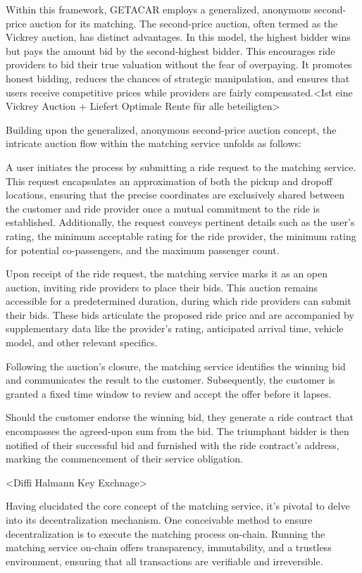 Within this framework, GETACAR employs a generalized, anonymous second-price auction for its matching. The second-price auction, often termed as the Vickrey auction, has distinct advantages. In this model, the highest bidder wins but pays the amount bid by the second-highest bidder. This encourages ride providers to bid their true valuation without the fear of overpaying. It promotes honest bidding, reduces the chances of strategic manipulation, and ensures that users receive competitive prices while providers are fairly compensated.<Ist eine Vickrey Auction + Liefert Optimale Rente für alle beteiligten>


Building upon the generalized, anonymous second-price auction concept, the intricate auction flow within the matching service unfolds as follows:

A user initiates the process by submitting a ride request to the matching service. This request encapsulates an approximation of both the pickup and dropoff locations, ensuring that the precise coordinates are exclusively shared between the customer and ride provider once a mutual commitment to the ride is established. Additionally, the request conveys pertinent details such as the user's rating, the minimum acceptable rating for the ride provider, the minimum rating for potential co-passengers, and the maximum passenger count.

Upon receipt of the ride request, the matching service marks it as an open auction, inviting ride providers to place their bids. This auction remains accessible for a predetermined duration, during which ride providers can submit their bids. These bids articulate the proposed ride price and are accompanied by supplementary data like the provider's rating, anticipated arrival time, vehicle model, and other relevant specifics.

Following the auction's closure, the matching service identifies the winning bid and communicates the result to the customer. Subsequently, the customer is granted a fixed time window to review and accept the offer before it lapses.

Should the customer endorse the winning bid, they generate a ride contract that encompasses the agreed-upon sum from the bid. The triumphant bidder is then notified of their successful bid and furnished with the ride contract's address, marking the commencement of their service obligation.

<Diffi Halmann Key Exchnage>

Having elucidated the core concept of the matching service, it's pivotal to delve into its decentralization mechanism. One conceivable method to ensure decentralization is to execute the matching process on-chain. Running the matching service on-chain offers transparency, immutability, and a trustless environment, ensuring that all transactions are verifiable and irreversible.

